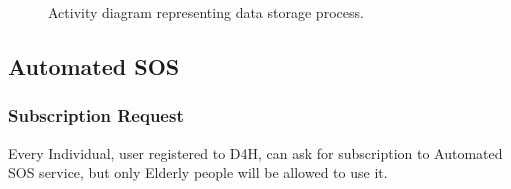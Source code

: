             \begin{figure}[H]
                \centering
                \caption{Activity diagram representing data storage process.}
                \label{fig:Data-storage-activity-diagram}
            \end{figure}
            
    \subsection{Automated SOS}
            
        \subsubsection{Subscription Request}
            
            Every Individual, user registered to D4H, can ask for subscription to Automated SOS service, but only Elderly people will be allowed to use it.
            
